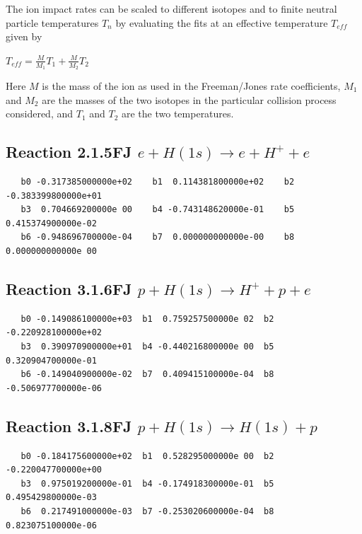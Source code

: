 \documentclass[12pt,dvips]{article}
\begin{document}
The ion impact rates can be scaled to different isotopes and to finite
neutral particle temperatures $T_n$ by evaluating the fits at an
effective temperature $T_{eff}$ given by

$T_{eff} = \frac {M}{M_1} T_1 + \frac{M}{M_2} T_2 $

Here $M$ is the mass of the ion as used in the Freeman/Jones rate coefficients,
$M_1$ and $M_2$ are the masses of the two isotopes in the particular collision
process considered, and $T_1$ and $T_2$ are the two temperatures.

\bigskip

\subsection{
Reaction 2.1.5FJ  $e + H (1s) \rightarrow e + H^+ + e$
}


\begin{small}\begin{verbatim}
   b0 -0.317385000000e+02    b1  0.114381800000e+02    b2 -0.383399800000e+01
   b3  0.704669200000e 00    b4 -0.743148620000e-01    b5  0.415374900000e-02
   b6 -0.948696700000e-04    b7  0.000000000000e-00    b8  0.000000000000e 00
\end{verbatim}\end{small}

\subsection{
Reaction 3.1.6FJ  $p + H(1s) \rightarrow H^+ + p + e $
}


\begin{small}\begin{verbatim}
   b0 -0.149086100000e+03  b1  0.759257500000e 02  b2 -0.220928100000e+02
   b3  0.390970900000e+01  b4 -0.440216800000e 00  b5  0.320904700000e-01
   b6 -0.149040900000e-02  b7  0.409415100000e-04  b8 -0.506977700000e-06
\end{verbatim}\end{small}

\subsection{
Reaction 3.1.8FJ  $p + H(1s) \rightarrow H(1s) + p  $
}


\begin{small}\begin{verbatim}
   b0 -0.184175600000e+02  b1  0.528295000000e 00  b2 -0.220047700000e+00
   b3  0.975019200000e-01  b4 -0.174918300000e-01  b5  0.495429800000e-03
   b6  0.217491000000e-03  b7 -0.253020600000e-04  b8  0.823075100000e-06
\end{verbatim}\end{small}
\end{document}
